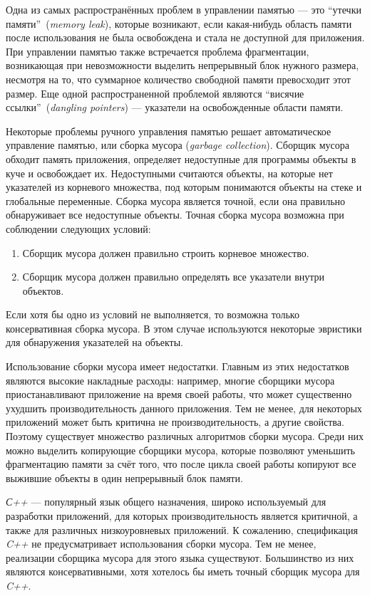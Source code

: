 \documentclass[14pt]{matmex-diploma}
\begin{document}
Одна из самых распространённых проблем в управлении \linebreak памятью --- это ``утечки памяти''~(\textit{memory leak}), 
которые возникают, если какая-нибудь область памяти после использования не была
освобождена и стала не доступной для приложения. При управлении памятью также встречается проблема фрагментации, возникающая при невозможности выделить непрерывный блок нужного размера,
несмотря на то, что суммарное количество свободной памяти превосходит этот размер. 
Еще одной распространенной проблемой являются ``висячие ссылки''~(\textit{dangling pointers}) --- указатели на освобожденные области памяти.

Некоторые проблемы ручного управления памятью решает автоматическое управление памятью, или сборка мусора (\textit{garbage collection}). 
Сборщик мусора обходит память приложения, определяет недоступные для программы
объекты в куче и освобождает их. Недоступными считаются объекты, на которые нет указателей из корневого множества, под которым понимаются объекты на стеке и глобальные переменные. Сборка мусора является точной, если она правильно обнаруживает все недоступные объекты. Точная сборка мусора возможна при соблюдении следующих условий:
\begin{enumerate}
\item{Сборщик мусора должен правильно строить корневое множество.}
\item{Сборщик мусора должен правильно определять все указатели внутри объектов.}
\end{enumerate}
Если хотя бы одно из условий не выполняется, то возможна только консервативная сборка мусора. В этом случае используются некоторые эвристики для 
обнаружения указателей на объекты.

Использование сборки мусора имеет недостатки. Главным из этих недостатков являются
высокие накладные расходы: например, многие сборщики мусора приостанавливают приложение
на время своей работы, что может существенно ухудшить производительность данного приложения. Тем не менее, для некоторых приложений может быть критична не производительность, а другие свойства. Поэтому
существует множество различных алгоритмов сборки мусора. Среди них можно выделить копирующие сборщики мусора, которые позволяют уменьшить фрагментацию памяти за счёт того, что после цикла своей работы копируют все выжившие объекты в один непрерывный блок памяти.

\textit{С++} --- популярный язык общего назначения, широко используемый
для разработки приложений, для которых производительность является критичной, а 
также для различных низкоуровневых приложений. К сожалению, спецификация \textit{C++} не предусматривает использования сборки мусора. Тем не менее, реализации сборщика мусора
для этого языка существуют\cite{mcc1, boehm1}. Большинство из них являются консервативными, хотя хотелось 
бы иметь точный сборщик мусора для \textit{C++}.
\end{document}
